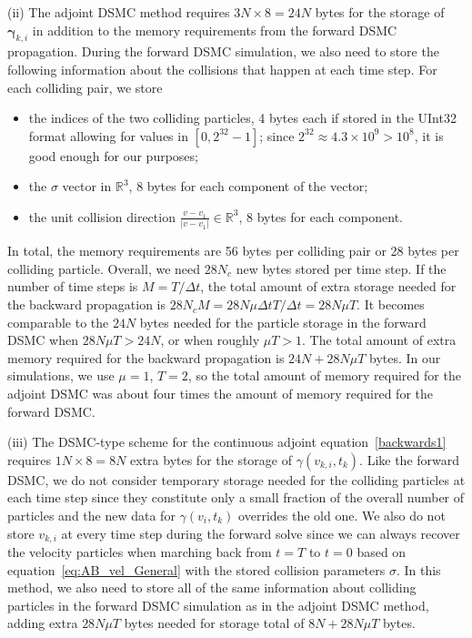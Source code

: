 \documentclass[times,final,nopreprintline]{elsarticle}
\newcommand{\bbR}{\mathbb R} \newcommand{\bbS}{\mathbb S}
\newcommand{\bgamma}{\boldsymbol \gamma}
\newcommand{\Rthree}{{\bbR^3}}
\begin{document}
(ii) The adjoint DSMC method requires $3N \times 8 = 24N$ bytes for the storage of $\bgamma_{k,i}$ in addition to the memory requirements from the forward DSMC propagation. During the forward DSMC simulation, we also need to store the following information about the collisions that happen at each time step. For each colliding pair, we store
\begin{itemize}
  \item the indices of the two colliding particles, 4 bytes each if stored in the UInt32 format allowing for values in $[0,2^{32}-1]$; since $2^{32} \approx 4.3 \times 10^9 > 10^8$, it is good enough for our purposes;
  \item the $\sigma$ vector in $\Rthree$, 8 bytes for each component of the vector;
  \item the unit collision direction $\frac{v-v_1}{|v-v_1|} \in \Rthree$, 8 bytes for each component.
\end{itemize}

In total, the memory requirements are 56 bytes per colliding pair or 28 bytes per colliding particle. Overall, we need $28N_c$ new bytes stored per time step. If the number of time steps is $M =T/\Delta t$, the total amount of extra storage needed for the backward propagation is $28 N_c M  = 28 N\mu \Delta t  T/\Delta t =  28 N\mu T$. 
It becomes comparable to the $24N$ bytes needed for the particle storage in the forward DSMC when  $28 N\mu T  > 24 N$, or when roughly $\mu T > 1$. The total amount of extra memory required for the backward propagation is $24N + 28 N\mu T$ bytes. In our simulations, we use $\mu=1$, $T=2$, so the total amount of memory required for the adjoint DSMC was about four times the amount of memory required for the forward DSMC.

(iii) The DSMC-type scheme for the continuous adjoint equation~\eqref{backwards1} requires $1N \times 8 = 8 N$ extra bytes for the storage of $\gamma(v_{k,i},t_k)$. Like the forward DSMC, we do not consider temporary storage needed for the colliding particles at each time step since they constitute only a small fraction of the overall number of particles and the new data for $\gamma(v_i,t_k)$ overrides the old one. We also do not store $v_{k,i}$ at every time step during the forward solve since we can always recover the velocity particles when marching back from $t=T$ to $t=0$ based on equation~\eqref{eq:AB_vel_General} with the stored collision parameters $\sigma$. In this method, we also need to store all of the same information about colliding particles in the forward DSMC simulation as in the adjoint DSMC method, adding extra $28 N\mu T$ bytes needed for storage total of $8N + 28 N\mu T$ bytes.
\end{document}
